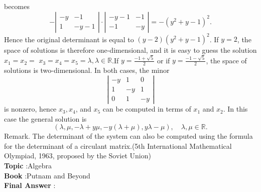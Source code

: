 \documentclass[10pt]{article}
\begin{document}
becomes$$ -\left|\begin{array}{cc} -y & -1 \\ 1 & -y-1 \end{array}\right| \cdot\left|\begin{array}{cc} -y-1 & -1 \\ -1 & -y \end{array}\right|=-\left(y^{2}+y-1\right)^{2} . $$Hence the original determinant is equal to $(y-2)\left(y^{2}+y-1\right)^{2}$. If $y=2$, the space of solutions is therefore one-dimensional, and it is easy to guess the solution $x_{1}=x_{2}=$ $x_{3}=x_{4}=x_{5}=\lambda, \lambda \in \mathbb{R}$.If $y=\frac{-1+\sqrt{5}}{2}$ or if $y=\frac{-1-\sqrt{5}}{2}$, the space of solutions is two-dimensional. In both cases, the minor$$ \left|\begin{array}{ccc} -y & 1 & 0 \\ 1 & -y & 1 \\ 0 & 1 & -y \end{array}\right| $$is nonzero, hence $x_{3}, x_{4}$, and $x_{5}$ can be computed in terms of $x_{1}$ and $x_{2}$. In this case the general solution is$$ (\lambda, \mu,-\lambda+y \mu,-y(\lambda+\mu), y \lambda-\mu), \quad \lambda, \mu \in \mathbb{R} . $$Remark. The determinant of the system can also be computed using the formula for the determinant of a circulant matrix.(5th International Mathematical Olympiad, 1963, proposed by the Soviet Union)\\
\textbf{Topic} :Algebra\\
\textbf{Book} :Putnam and Beyond\\
\textbf{Final Answer} :\\
\end{document}
